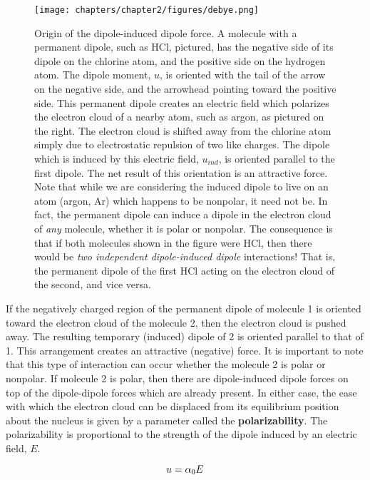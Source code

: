     \begin{figure}[h!]
    \centering
      \texttt{[image: chapters/chapter2/figures/debye.png]}
      \caption{Origin of the dipole-induced dipole force. A molecule with a permanent dipole, such as HCl, pictured, has the negative side of its dipole on the chlorine atom, and the positive side on the hydrogen atom. The dipole moment, $u$, is oriented with the tail of the arrow on the negative side, and the arrowhead pointing toward the positive side. This permanent dipole creates an electric field which polarizes the electron cloud of a nearby atom, such as argon, as pictured on the right. The electron cloud is shifted away from the chlorine atom simply due to electrostatic repulsion of two like charges. The dipole which is induced by this electric field, $u_{ind}$, is oriented parallel to the first dipole. The net result of this orientation is an attractive force. Note that while we are considering the induced dipole to live on an atom (argon, Ar) which happens to be nonpolar, it need not be. In fact, the permanent dipole can induce a dipole in the electron cloud of \textit{any} molecule, whether it is polar or nonpolar. The consequence is that if both molecules shown in the figure were HCl, then there would be \textit{two independent dipole-induced dipole} interactions! That is, the permanent dipole of the first HCl acting on the electron cloud of the second, and vice versa.}
      \label{fig:debye}
    \end{figure}

    If the negatively charged region of the permanent dipole of molecule 1 is oriented toward the electron cloud of the molecule 2, then the electron cloud is pushed away. The resulting temporary (induced) dipole of 2 is oriented parallel to that of 1. This arrangement creates an attractive (negative) force. It is important to note that this type of interaction can occur whether the molecule 2 is polar or nonpolar. If molecule 2 is polar, then there are dipole-induced dipole forces on top of the dipole-dipole forces which are already present. In either case, the ease with which the electron cloud can be displaced from its equilibrium position about the nucleus is given by a parameter called the \textbf{polarizability}. The polarizability is proportional to the strength of the dipole induced by an electric field, $E$.

    \begin{equation}
    \label{polarizability definition}
        u=\alpha\textsubscript{0}E
    \end{equation}

